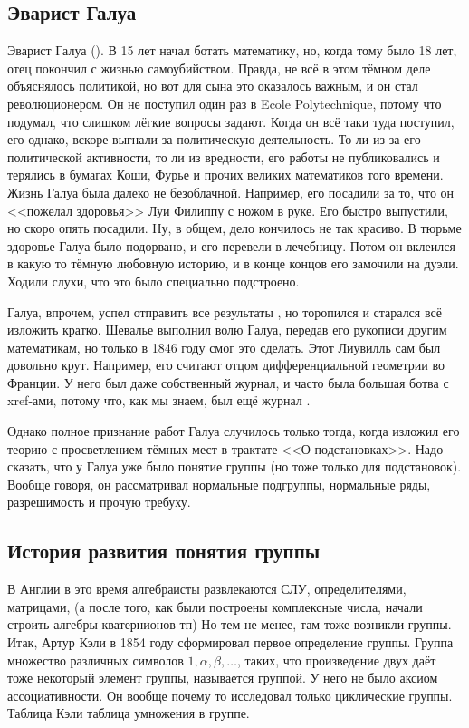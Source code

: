 \documentclass[a4paper,oneside,fleqn,10pt]{article}
\begin{document}
\subsection{Эварист Галуа}

Эварист Галуа (). В 15 лет начал ботать математику, но,
когда тому было 18 лет, отец покончил с жизнью самоубийством. Правда,
не всё в этом тёмном деле объяснялось политикой, но вот для сына это
оказалось важным, и он стал революционером.  Он не поступил один раз в
Ecole Polytechnique, потому что подумал, что слишком лёгкие вопросы
задают. Когда он всё таки туда поступил, его однако, вскоре выгнали за
политическую деятельность.  То ли из за его политической активности,
то ли из вредности, его работы не публиковались и терялись в бумагах
Коши, Фурье и прочих великих математиков того времени.  Жизнь Галуа
была далеко не безоблачной. Например, его посадили за то, что он
<<пожелал здоровья>> Луи Филиппу с ножом в руке. Его быстро выпустили,
но скоро опять посадили.  Ну, в общем, дело кончилось не так
красиво. В тюрьме здоровье Галуа было подорвано, и его перевели в
лечебницу. Потом он вклеился в какую то тёмную любовную историю, и в
конце концов его замочили на дуэли. Ходили слухи, что это было
специально подстроено.

Галуа, впрочем, успел отправить все результаты
, но торопился и старался всё изложить
кратко. Шевалье выполнил волю Галуа, передав его рукописи другим
математикам, но только в 1846 году  смог это сделать. Этот Лиувилль сам был довольно
крут. Например, его считают отцом дифференциальной геометрии во
Франции. У него был даже собственный журнал, и часто была большая
ботва с xref-ами, потому что, как мы знаем, был ещё журнал
.

Однако полное признание работ Галуа случилось только тогда, когда
 изложил его теорию с
просветлением тёмных мест в трактате <<О подстановках>>.  Надо
сказать, что у Галуа уже было понятие группы (но тоже только для
подстановок).  Вообще говоря, он рассматривал нормальные подгруппы,
нормальные ряды, разрешимость и прочую требуху.

\subsection{История развития понятия группы}

В Англии в это время алгебраисты развлекаются СЛУ, определителями,
матрицами, (а после того, как были построены комплексные числа, начали
строить алгебры кватернионов тп) Но тем не менее, там тоже возникли
группы. Итак, Артур Кэли в 1854 году сформировал первое определение
группы.  Группа множество различных символов $1, \alpha,
\beta,\ldots$, таких, что произведение двух даёт тоже некоторый
элемент группы, называется группой.  У него не было аксиом
ассоциативности. Он вообще почему то исследовал только циклические
группы. Таблица Кэли таблица умножения в группе.
\end{document}
